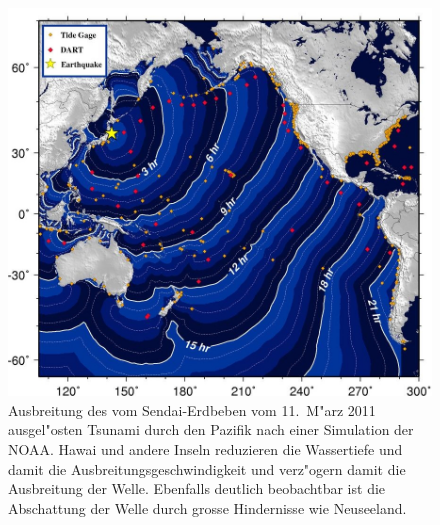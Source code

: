 \begin{figure}
\begin{center}
\includegraphics[width=\hsize]{graphics/sendainoaa}
\end{center}
\caption{Ausbreitung des vom Sendai-Erdbeben vom 11.~M"arz 2011 
ausgel"osten Tsunami durch den Pazifik nach einer Simulation der NOAA.
Hawai und andere Inseln reduzieren die Wassertiefe und damit die
Ausbreitungsgeschwindigkeit und verz"ogern damit die Ausbreitung
der Welle. Ebenfalls deutlich beobachtbar ist die Abschattung 
der Welle durch grosse Hindernisse wie Neuseeland.
\label{tsunamiausbreitung}}
\end{figure}

